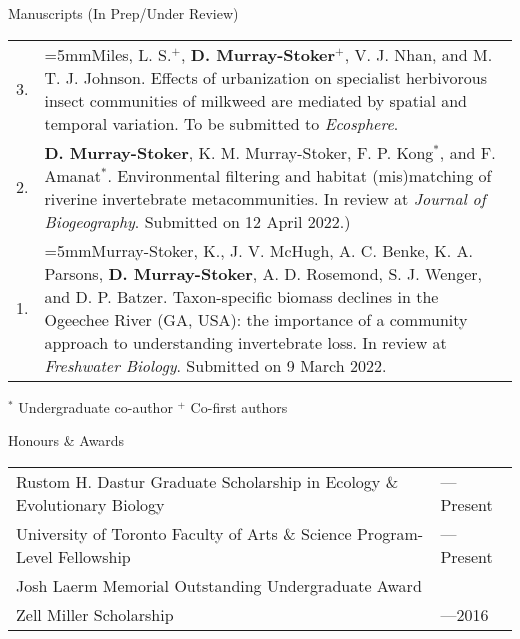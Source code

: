 \documentclass[letterpaper,11pt,oneside]{article}
\begin{document}
\bigskip





\noindent\Large{Manuscripts (In Prep/Under Review)} 
\normalsize
\bigskip

\def\arraystretch{1.4}
\noindent \begin{longtable}{@{} p{0.5cm} >{\raggedright\arraybackslash}p{16.7cm}}
3. & \hangindent=5mmMiles, L. S.$^{+}$, \textbf{D. Murray-Stoker}$^{+}$, V. J. Nhan, and M. T. J. Johnson. Effects of urbanization on specialist herbivorous insect communities of milkweed are mediated by spatial and temporal variation. To be submitted to \textit{Ecosphere}. \\
2. & \hangindent=5mm\textbf{D. Murray-Stoker}, K. M. Murray-Stoker, F. P. Kong$^{*}$, and F. Amanat$^{*}$. Environmental filtering and habitat (mis)matching of riverine invertebrate metacommunities. In review at \textit{Journal of Biogeography}. Submitted on 12 April 2022.) \\
1. & \hangindent=5mmMurray-Stoker, K., J. V. McHugh, A. C. Benke, K. A. Parsons, \textbf{D. Murray-Stoker}, A. D. Rosemond, S. J. Wenger, and D. P. Batzer. Taxon-specific biomass declines in the Ogeechee River (GA, USA): the importance of a community approach to understanding invertebrate loss. In review at \textit{Freshwater Biology}. Submitted on 9 March 2022. \\
 \end{longtable}

 \smallskip
 \noindent $^{*}$ Undergraduate co-author
 \noindent $^{+}$ Co-first authors

\bigskip





\noindent\Large{Honours \& Awards}
\normalsize
\bigskip

\noindent \begin{longtable}{@{} >{\raggedright\arraybackslash}p{16cm} >{\raggedright\arraybackslash}p{1.2cm}}
Rustom H. Dastur Graduate Scholarship in Ecology \& Evolutionary Biology & 2018---Present \\ 
University of Toronto Faculty of Arts \& Science Program-Level Fellowship & 2018---Present \\
Josh Laerm Memorial Outstanding Undergraduate Award & 2015 \\
Zell Miller Scholarship & 2011---2016 \\
\end{longtable}
\end{document}
